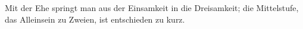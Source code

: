 Mit der Ehe springt man aus der Einsamkeit in die Dreisamkeit; die Mittelstufe, das Alleinsein zu Zweien, ist entschieden zu kurz.
\par

